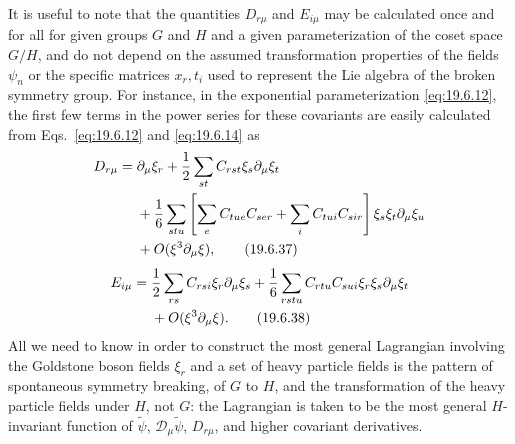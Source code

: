It is useful to note that the quantities $D_{r\mu}$ and $E_{i\mu}$ may be calculated once and for all for given groups $G$ and $H$ and a given parameterization of the coset space $G/H$, and do not depend on the assumed transformation properties of the fields $\psi_n$ or the specific matrices $x_r,t_i$ used to represent the Lie algebra of the broken symmetry group. For instance, in the exponential parameterization \eqref{eq:19.6.12}, the first few terms in the power series for these covariants are easily calculated from Eqs.~\eqref{eq:19.6.12} and \eqref{eq:19.6.14} as
\begin{align}
D_{r\mu}
={}&\partial_\mu\xi_r
+\frac{1}{2}\sum_{st}C_{rst}\xi_s\partial_\mu\xi_t
\notag\\
&+\frac{1}{6}\sum_{stu}
\left[
\sum_eC_{tue}C_{ser}
+\sum_iC_{tui}C_{sir}
\right]\xi_s\xi_t\partial_\mu\xi_u
\notag\\
&+O(\xi^3\partial_\mu\xi),
\tag{19.6.37}\label{eq:19.6.37}
\end{align}
\begin{align}
E_{i\mu}
={}&\frac{1}{2}\sum_{rs}C_{rsi}\xi_r\partial_\mu\xi_s
+\frac{1}{6}\sum_{rstu}C_{rtu}C_{sui}
\xi_r\xi_s\partial_\mu\xi_t
\notag\\
&+O(\xi^3\partial_\mu\xi).
\tag{19.6.38}\label{eq:19.6.38}
\end{align}
All we need to know in order to construct the most general Lagrangian involving the Goldstone boson fields $\xi_r$ and a set of heavy particle fields is the pattern of spontaneous symmetry breaking, of $G$ to $H$, and the transformation of the heavy particle fields under $H$, not $G$: the Lagrangian is taken to be the most general $H$-invariant function of $\widetilde\psi$, $\mathcal D_\mu\widetilde\psi$, $D_{r\mu}$, and higher covariant derivatives.

